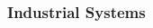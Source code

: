 \documentclass{beamer}
\begin{document}
\begin{frame}
    \frametitle{Industrial Systems}

    \begin{columns}
        \begin{column}{.3\textwidth}
        \end{column}
        \begin{column}{.3\textwidth}
\end{column}
\end{columns}
\end{frame}
\end{document}

